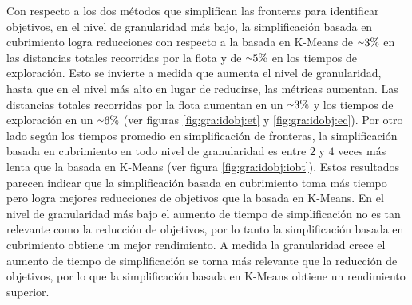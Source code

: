 Con respecto a los dos métodos que simplifican las fronteras para 
identificar objetivos, en el nivel de granularidad más bajo, la
simplificación basada en cubrimiento logra reducciones con respecto a la
basada en K-Means de ${\smallsim}3\%$ en las distancias totales recorridas por la
flota y de ${\smallsim}5\%$ en los tiempos de exploración. Esto se invierte a
medida que aumenta el nivel de granularidad, hasta que en el nivel más alto en
lugar de reducirse, las métricas aumentan. Las distancias totales recorridas por la
flota aumentan en un ${\smallsim}3\%$ y los tiempos de exploración en un
${\smallsim}6\%$ (ver figuras \ref{fig:gra:idobj:et} y \ref{fig:gra:idobj:ec}). Por otro lado según los tiempos
promedio en simplificación de fronteras, la simplificación basada en
cubrimiento en todo nivel de granularidad es entre $2$ y
$4$ veces más lenta que la basada en K-Means (ver figura \ref{fig:gra:idobj:iobt}). Estos resultados
parecen indicar que la simplificación basada en cubrimiento toma más tiempo
pero logra mejores reducciones de objetivos que la basada en K-Means. En el
nivel de granularidad más bajo el aumento de tiempo de simplificación no es tan
relevante como la reducción de objetivos, por lo tanto la simplificación basada
en cubrimiento obtiene un mejor rendimiento. A medida la granularidad crece el
aumento de tiempo de simplificación se torna más relevante que la reducción de
objetivos, por lo que la simplificación basada en K-Means obtiene un
rendimiento superior.  

